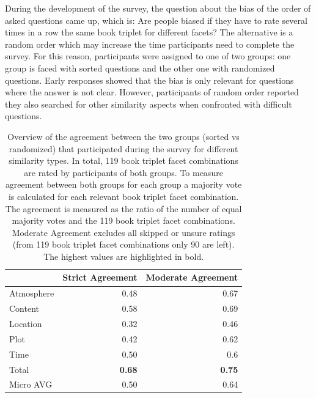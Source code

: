 \documentclass[11pt]{article}
\begin{document}
During the development of the survey, the question about the bias of the order of asked questions came up, which is:
Are people biased if they have to rate several times in a row the same book triplet for different facets?
The alternative is a random order which may increase the time participants need to complete the survey.
For this reason, participants were assigned to one of two groups: one group is faced with sorted questions and the other one with randomized questions.
Early responses showed that the bias is only relevant for questions where the answer is not clear.
However, participants of random order reported they also searched for other similarity aspects when confronted with difficult questions.

\begin{table}
	\centering
	\begin{tabular}{lrr}
		\toprule
		& Strict Agreement & Moderate Agreement \\
		\midrule
		Atmosphere & 0.48                       & 0.67                         \\
		Content    & 0.58                       & 0.69                         \\
		Location   & 0.32                       & 0.46                         \\
		Plot       & 0.42                       & 0.62                         \\
		Time       & 0.50                       & 0.6                         \\
		Total      & \textbf{0.68}              & \textbf{0.75}                 \\
		Micro AVG  & 0.50                       & 0.64                         \\
		\bottomrule
	\end{tabular}
	\caption[Overview of the Group Agreement]{Overview of the agreement between the two groups (sorted vs randomized) that participated during the survey for different similarity types.
		In total, 119 book triplet facet combinations are rated by participants of both groups. To measure agreement between both groups for each group a majority vote is calculated for each relevant book triplet facet combination. The agreement is measured as the ratio of the number of equal majority votes and the 119 book triplet facet combinations. 
		Moderate Agreement excludes all skipped or unsure ratings (from 119 book triplet facet combinations only 90 are left). The highest values are highlighted in bold.}
	\label{tab:group_agreement}
\end{table}
\end{document}
